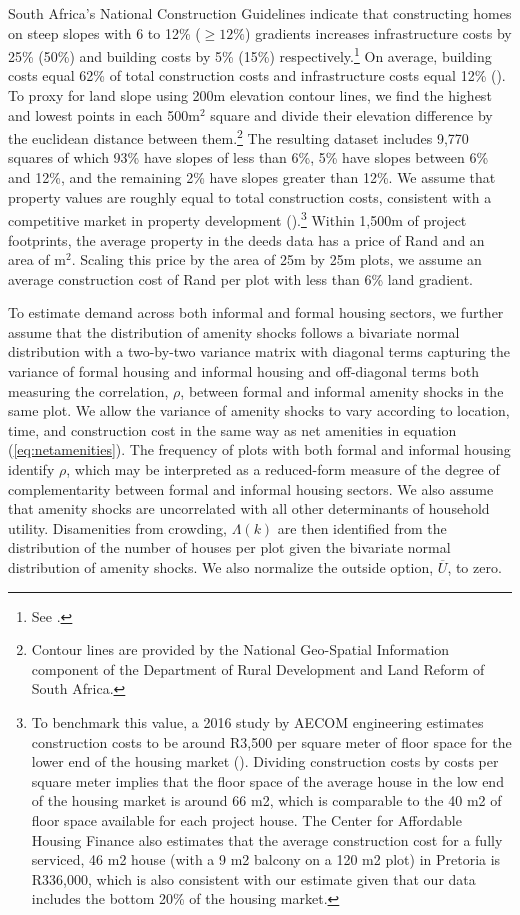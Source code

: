 \documentclass[12pt]{article}
\begin{document}
South Africa's National Construction Guidelines indicate that constructing homes on steep slopes with 6 to 12\% ($\geq12\%$) gradients increases infrastructure costs by 25\% (50\%) and building costs by 5\% (15\%) respectively.\footnote{See \cite{redbook}.}  On average, building costs equal 62\% of total construction costs and infrastructure costs equal 12\% (\cite{cahfcosts}).  To proxy for land slope using 200m elevation contour lines, we find the highest and lowest points in each 500$\text{m}^{2}$ square and divide their elevation difference by the euclidean distance between them.\footnote{Contour lines are provided by the National Geo-Spatial Information component of the Department of Rural Development and Land Reform of South Africa. }  The resulting dataset includes 9,770 squares of which 93\% have slopes of less than 6\%, 5\% have slopes between 6\% and 12\%, and the remaining 2\% have slopes greater than 12\%.  We assume that property values are roughly equal to total construction costs, consistent with a competitive market in property development (\cite{cahfcosts}).\footnote{To benchmark this value, a 2016 study by AECOM engineering estimates construction costs to be around R3,500 per square meter of floor space for the lower end of the housing market (\cite{aecom}).  Dividing construction costs by costs per square meter implies that the floor space of the average house in the low end of the housing market is around 66 m2, which is comparable to the 40 m2 of floor space available for each project house.  The Center for Affordable Housing Finance also estimates that the average construction cost for a fully serviced, 46 m2 house (with a 9 m2 balcony on a 120 m2 plot) in Pretoria is R336,000, which is also consistent with our estimate given that our data includes the bottom 20\% of the housing market.}  Within 1,500m of project footprints, the average property in the deeds data has a price of Rand and an area of $\text{m}^{2}$.  Scaling this price by the area of 25m by 25m plots, we assume an average construction cost of Rand per plot with less than 6\% land gradient.

To estimate demand across both informal and formal housing sectors, we further assume that the distribution of amenity shocks follows a bivariate normal distribution with a two-by-two variance matrix with diagonal terms capturing the variance of formal housing and informal housing and off-diagonal terms both measuring the correlation, $\rho$, between formal and informal amenity shocks in the same plot.  We allow the variance of amenity shocks to vary according to location, time, and construction cost in the same way as net amenities in equation (\ref{eq:netamenities}).  The frequency of plots with both formal and informal housing identify $\rho$, which may be interpreted as a reduced-form measure of the degree of complementarity between formal and informal housing sectors.  We also assume that amenity shocks are uncorrelated with all other determinants of household utility.  Disamenities from crowding, $\Lambda(k)$ are then identified from the distribution of the number of houses per plot given the bivariate normal distribution of amenity shocks.  We also normalize the outside option, $\overline{U}$, to zero. 
\end{document}

